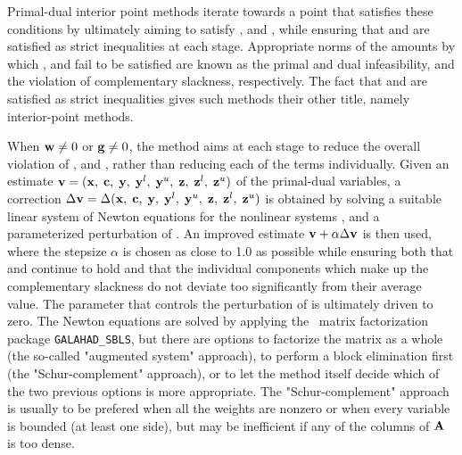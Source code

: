 \documentclass{galahad}
\begin{document}
Primal-dual interior point methods iterate towards a point
that satisfies these conditions by ultimately aiming to satisfy
,  and , while ensuring that 
 and  are 
satisfied as strict inequalities at each stage. 
Appropriate norms of the amounts by 
which ,  and  fail to be satisfied are known as the
primal and dual infeasibility, and the violation of complementary slackness,
respectively. The fact that  and  are satisfied as strict 
inequalities gives such methods their other title, namely 
interior-point methods.

When ${\mathbf{w}} \neq 0$ or ${\mathbf{g}} \neq 0$, the method aims at each stage to reduce the
overall violation of ,  and , 
rather than reducing each of the terms individually. Given an estimate 
${\mathbf{v}} = ({\mathbf{x}}, \; {\mathbf{c}}, \; {\mathbf{y}}, \; {\mathbf{y}}^{l}, \;
{\mathbf{y}}^{u}, \; {\mathbf{z}}, \; {\mathbf{z}}^{l}, \; {\mathbf{z}}^{u})$
of the primal-dual variables, a correction
$\Delta {\mathbf{v}} = \Delta ({\mathbf{x}}, \; {\mathbf{c}}, \; {\mathbf{y}}, \; {\mathbf{y}}^{l},
 \; {\mathbf{y}}^{u} ,\;{\mathbf{z}},\;{\mathbf{z}}^{l} ,\;{\mathbf{z}}^{u} )$
is obtained by solving a suitable linear system of Newton equations for the
nonlinear systems ,  and a parameterized perturbation of 
. An improved estimate ${\mathbf{v}} + \alpha \Delta {\mathbf{v}}$ 
is then used, where the stepsize $\alpha$
is chosen as close to 1.0 as possible while ensuring both that
 and  continue to hold and that the individual components
which make up the complementary slackness 
 do not deviate too significantly
from their average value. The parameter that controls the perturbation
of  is ultimately driven to zero.
The Newton equations are solved  by applying the 
\galahad\ matrix factorization package 
{\tt GALAHAD\_SBLS}, but there are options 
to factorize the matrix as a whole (the so-called "augmented system"
approach), to perform a block elimination first (the "Schur-complement"
approach), or to let the method itself decide which of the two
previous options is more appropriate.
The "Schur-complement" approach is usually to be prefered when all the
weights are nonzero or when every variable is bounded (at least one side),
but may be inefficient if any of the columns of ${\mathbf{A}}$ is too dense.
\end{document}
